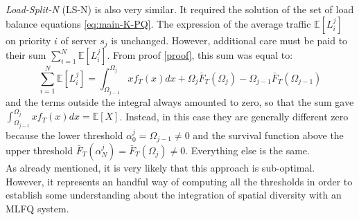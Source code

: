 \textit{Load-Split-N} (LS-N) is also very similar. It required the solution of the set of load balance equations \ref{eq:main-K-PQ}. The expression of the average traffic $\mathbb{E}[L_i^j]$ on priority $i$ of server $s_j$ is unchanged. However, additional care must be paid to their sum $\sum_{i=1}^{N}\mathbb{E}[L_i^j]$. From proof \ref{proof}, this sum was equal to:
\[
\sum_{i=1}^{N}\mathbb{E}[L_i^j] = \int_{\Omega_{j-1}}^{\Omega_j}xf_T(x)dx + \Omega_{j} \bar{F}_T(\Omega_{j}) -\Omega_{j-1}\bar{F}_T(\Omega_{j-1})
\]
and the terms outside the integral always amounted to zero, so that the sum gave $\int_{\Omega_{j-1}}^{\Omega_j}xf_T(x)dx = \mathbb{E}[X]$. Instead, in this case they are generally different zero because the lower threshold $\alpha_0^j = \Omega_{j-1} \neq 0$ and the survival function above the upper threshold $\bar{F}_T(\alpha_N^j) = \bar{F}_T(\Omega_j) \neq 0$. Everything else is the same.
\\

As already mentioned, it is very likely that this approach is sub-optimal. However, it represents an handful way of computing all the thresholds in order to establish some understanding about the integration of spatial diversity with an MLFQ system. 